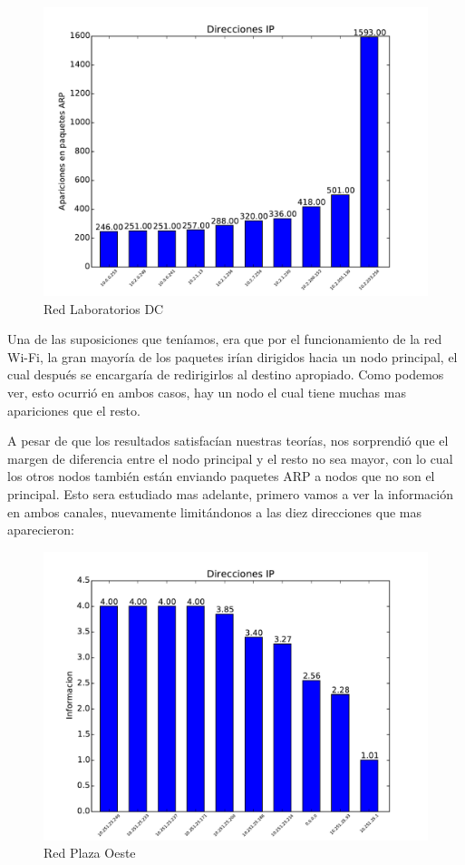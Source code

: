 \begin{figure}[ht]
\begin{center}
\includegraphics[width=0.6\columnwidth]{graficos/dc_top_s2.pdf}
\caption{Red Laboratorios DC}
\end{center}
\end{figure}

\pagebreak

Una de las suposiciones que teníamos, era que por el funcionamiento de la red Wi-Fi, la gran mayoría de los paquetes irían dirigidos hacia un nodo principal, el cual después se encargaría de redirigirlos al destino apropiado. Como podemos ver, esto ocurrió en ambos casos, hay un nodo el cual tiene muchas mas apariciones que el resto.

A pesar de que los resultados satisfacían nuestras teorías, nos sorprendió que el margen de diferencia entre el nodo principal y el resto no sea mayor, con lo cual los otros nodos también están enviando paquetes ARP a nodos que no son el principal. Esto sera estudiado mas adelante, primero vamos a ver la información en ambos canales, nuevamente limitándonos a las diez direcciones que mas aparecieron:

\begin{figure}[ht]
\begin{center}
\includegraphics[width=0.6\columnwidth]{graficos/plaza_top_inf_s2.pdf}
\caption{Red Plaza Oeste}
\end{center}
\end{figure}

